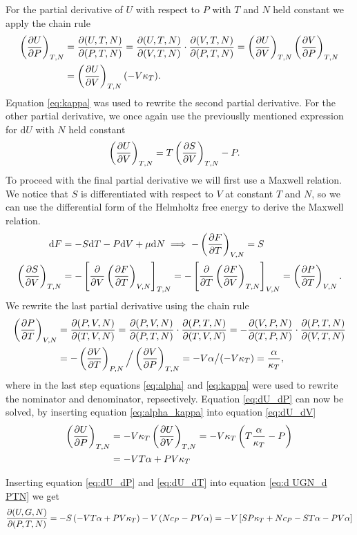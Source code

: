 \documentclass[reprint,english,notitlepage,aps,nobalancelastpage,nofootinbib]{revtex4-1}
\newcommand{\closed}[1]{\left(#1\right)}
\newcommand{\bracket}[1]{\left[#1\right]}
\newcommand{\kt}{\kappa_T}
\renewcommand{\cp}{c_P}
\renewcommand{\a}{\alpha}
\newcommand{\tmdv}[4]{\closed{\pdv{#1}{#2}}_{#3,#4}}
\newcommand{\jacobian}[2]{\pdv{(#1)}{(#2)}}
\renewcommand{\d}{\mathrm{d}}
\begin{document}
For the partial derivative of $U$ with respect to $P$ with $T$ and $N$ held constant we apply the chain rule
\begin{align}
	\tmdv{U}{P}{T}{N} &= \jacobian{U,T,N}{P,T,N} = \jacobian{U,T,N}{V,T,N}\cdot \jacobian{V,T,N}{P,T,N} = \tmdv{U}{V}{T}{N} \tmdv{V}{P}{T}{N} \nonumber \\
	&= \tmdv{U}{V}{T}{N}(-V\kt). \label{eq:dU_dP}
\end{align}
Equation \eqref{eq:kappa} was used to rewrite the second partial derivative. For the other partial derivative, we once again use the previouslly mentioned expression for $\d U$ with $N$ held constant 
\begin{align} \label{eq:dU_dV}
	\tmdv{U}{V}{T}{N} &= T \tmdv{S}{V}{T}{N} - P.
\end{align}
To proceed with the final partial derivative we will first use a Maxwell relation. We notice that $S$ is differentiated with respect to $V$ at constant $T$ and $N$, so we can use the differential form of the Helmholtz free energy to derive the Maxwell relation. 
\begin{align*}
	\d F &= -S \d T -P \d V + \mu \d N \implies -\tmdv{F}{T}{V}{N} = S \\ 
	\tmdv{S}{V}{T}{N} &=-\bracket{\pdv{V}\tmdv{F}{T}{V}{N}}_{T,N} = -\bracket{\pdv{T}\tmdv{F}{V}{T}{N}}_{V,N} = \tmdv{P}{T}{V}{N}.
\end{align*} 
We rewrite the last partial derivative using the chain rule 
\begin{align}
	\tmdv{P}{T}{V}{N} &= \jacobian{P,V,N}{T,V,N} = \jacobian{P,V,N}{P,T,N}\cdot \jacobian{P,T,N}{T,V,N} = -\jacobian{V,P,N}{T,P,N}\cdot \jacobian{P,T,N}{V,T,N} \nonumber \\ 
	&= -\tmdv{V}{T}{P}{N} \Big/ \tmdv{V}{P}{T}{N} = -V\a \big/ (-V\kt) = \frac{\a}{\kt}, \label{eq:alpha_kappa}
\end{align} 
where in the last step equations \eqref{eq:alpha} and \eqref{eq:kappa} were used to rewrite the nominator and denominator, repsectively. Equation \eqref{eq:dU_dP} can now be solved, by inserting equation \eqref{eq:alpha_kappa} into equation \eqref{eq:dU_dV} 
\begin{align*}
	\tmdv{U}{P}{T}{N} &= -V\kt \tmdv{U}{V}{T}{N} = -V\kt \closed{T\frac{\a}{\kt} - P} \\ 
	&= -VT \a + PV\kt 
\end{align*}

Inserting equation \eqref{eq:dU_dP} and \eqref{eq:dU_dT} into equation \eqref{eq:d UGN_d PTN} we get 
\begin{align}
	\jacobian{U,G,N}{P,T,N} = -S \closed{-VT \a + PV\kt} - V \closed{N\cp - PV\a} = -V\bracket{SP\kt + N\cp -ST\a - PV\a} \label{eq:d UGN_d PTN final expression}
\end{align}
\end{document}
